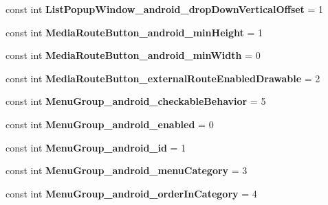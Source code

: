 \begin{DoxyCompactItemize}
const int {\bfseries List\+Popup\+Window\+\_\+android\+\_\+drop\+Down\+Vertical\+Offset} = 1
\item 
\mbox{\label{classXaria_1_1Resource_1_1Styleable_a2348e4096276ef3309a0e9e78c91b0a5}} 
const int {\bfseries Media\+Route\+Button\+\_\+android\+\_\+min\+Height} = 1
\item 
\mbox{\label{classXaria_1_1Resource_1_1Styleable_a4f81781aa1a762848298131df14eb8f4}} 
const int {\bfseries Media\+Route\+Button\+\_\+android\+\_\+min\+Width} = 0
\item 
\mbox{\label{classXaria_1_1Resource_1_1Styleable_ad6e7283291871e35a02123ac924780b2}} 
const int {\bfseries Media\+Route\+Button\+\_\+external\+Route\+Enabled\+Drawable} = 2
\item 
\mbox{\label{classXaria_1_1Resource_1_1Styleable_a29f3a2f06b824386ef48eb21aeea6849}} 
const int {\bfseries Menu\+Group\+\_\+android\+\_\+checkable\+Behavior} = 5
\item 
\mbox{\label{classXaria_1_1Resource_1_1Styleable_a6d453745595fffc84108067bd863db2a}} 
const int {\bfseries Menu\+Group\+\_\+android\+\_\+enabled} = 0
\item 
\mbox{\label{classXaria_1_1Resource_1_1Styleable_aac868ecb8e5e111540d69d6e1db15c6d}} 
const int {\bfseries Menu\+Group\+\_\+android\+\_\+id} = 1
\item 
\mbox{\label{classXaria_1_1Resource_1_1Styleable_a215551c1265d6ad105900fee8b313f92}} 
const int {\bfseries Menu\+Group\+\_\+android\+\_\+menu\+Category} = 3
\item 
\mbox{\label{classXaria_1_1Resource_1_1Styleable_a5a24a44105c3a455801d7a2be7c06f66}} 
const int {\bfseries Menu\+Group\+\_\+android\+\_\+order\+In\+Category} = 4
\item 
\mbox{\label{classXaria_1_1Resource_1_1Styleable_aaddb0f7102cd94cb486db9cb47f457c6}} 

\end{DoxyCompactItemize}
